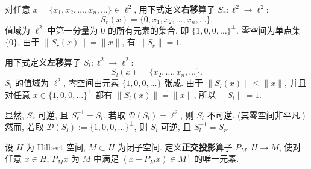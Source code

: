 \begin{Example}
\label{ex:right-left-shifts-domain-dependent-inverses}
对任意 $x=\{x_1,x_2,\ldots,x_n,\ldots\}\in\ell^2$, 用下式定义\textbf{右移}算子 $S_r:\ell^2\to\ell^2$:\[S_r(x)=\{0,x_1,x_2,\ldots,x_n,\ldots\}.\]值域为 $\ell^2$ 中第一分量为 $0$ 的所有元素的集合, 即 $\{1,0,0,\ldots\}^{\perp}$. 零空间为单点集 $\{0\}$. 由于 $\|S_r(x)\|=\|x\|$, 有 $\|S_r\|=1$.

用下式定义\textbf{左移}算子 $S_l:\ell^2\to\ell^2$:\[S_l(x)=\{x_2,\ldots,x_n,\ldots\}.\]$S_l$ 的值域为 $\ell^2$, 零空间由元素 $\{1,0,0,\ldots\}$ 张成. 由于 $\|S_l(x)\|\leq\|x\|$, 并且对任意 $x\in\{1,0,0,\ldots\}^{\perp}$ 都有 $\|S_l(x)\|=\|x\|$, 所以 $\|S_l\|=1$.

显然, $S_r$ 可逆, 且 $S_r^{-1}=S_l$. 若取 $\mathcal{D}(S_l)=\ell^2$, 则 $S_l$ 不可逆. (其零空间非平凡.) 然而, 若取 $\mathcal{D}(S_l):=\{1,0,0,\ldots\}^{\perp}$, 则 $S_l$ 可逆, 且 $S_l^{-1}=S_r$.
\end{Example}

\begin{Example}
\label{ex:orthogonal-projection-operator}
设 $H$ 为 Hilbert 空间, $M\subset H$ 为闭子空间. 定义\textbf{正交投影}算子 $P_M:H\to M$, 使对任意 $x\in H$, $P_Mx$ 为 $M$ 中满足 $(x-P_Mx)\in M^{\perp}$ 的唯一元素.
\end{Example}
